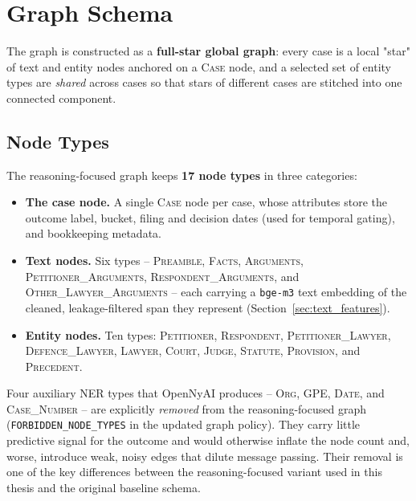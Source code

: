 \section{Graph Schema}
\label{sec:graph_schema}

The graph is constructed as a \textbf{full-star global graph}: every
case is a local "star" of text and entity nodes anchored on a
\textsc{Case} node, and a selected set of entity types are
\emph{shared} across cases so that stars of different cases are
stitched into one connected component.

\subsection{Node Types}

The reasoning-focused graph keeps \textbf{17 node types} in three
categories:

\begin{sloppypar}
\begin{itemize}
  \item \textbf{The case node.} A single \textsc{Case} node per case,
    whose attributes store the outcome label, bucket, filing and
    decision dates (used for temporal gating), and bookkeeping
    metadata.
  \item \textbf{Text nodes.} Six types -- \textsc{Preamble},
    \textsc{Facts}, \textsc{Arguments},
    \textsc{Petitioner\_Arguments}, \textsc{Respondent\_Arguments},
    and \textsc{Other\_Lawyer\_Arguments} -- each carrying a
    \texttt{bge-m3} text embedding of the cleaned, leakage-filtered
    span they represent (Section~\ref{sec:text_features}).
  \item \textbf{Entity nodes.} Ten types: \textsc{Petitioner},
    \textsc{Respondent}, \textsc{Petitioner\_Lawyer},
    \textsc{Defence\_Lawyer}, \textsc{Lawyer}, \textsc{Court},
    \textsc{Judge}, \textsc{Statute}, \textsc{Provision}, and
    \textsc{Precedent}.
\end{itemize}
\end{sloppypar}

Four auxiliary NER types that OpenNyAI produces -- \textsc{Org},
\textsc{GPE}, \textsc{Date}, and \textsc{Case\_Number} -- are
explicitly \emph{removed} from the reasoning-focused graph
(\texttt{FORBIDDEN\_NODE\_TYPES} in the updated graph policy). They
carry little predictive signal for the outcome and would otherwise
inflate the node count and, worse, introduce weak, noisy edges that
dilute message passing. Their removal is one of the key differences
between the reasoning-focused variant used in this thesis and the
original baseline schema.

